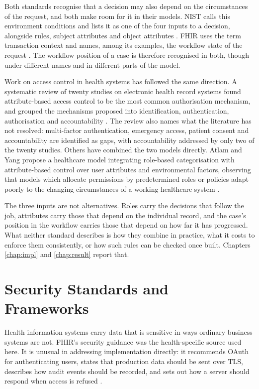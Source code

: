 Both standards recognise that a decision may also depend on the circumstances of the request, and both make room for it in their models. NIST calls this environment conditions and lists it as one of the four inputs to a decision, alongside rules, subject attributes and object attributes \cite{nist80162}. FHIR uses the term transaction context and names, among its examples, the workflow state of the request \cite{hl7fhir}. The workflow position of a case is therefore recognised in both, though under different names and in different parts of the model.

Work on access control in health systems has followed the same direction. A systematic review of twenty studies on electronic health record systems found attribute-based access control to be the most common authorisation mechanism, and grouped the mechanisms proposed into identification, authentication, authorisation and accountability \cite{cobrado2024}. The review also names what the literature has not resolved: multi-factor authentication, emergency access, patient consent and accountability are identified as gaps, with accountability addressed by only two of the twenty studies. Others have combined the two models directly. Atlam and Yang propose a healthcare model integrating role-based categorisation with attribute-based control over user attributes and environmental factors, observing that models which allocate permissions by predetermined roles or policies adapt poorly to the changing circumstances of a working healthcare system \cite{atlam2025}.

The three inputs are not alternatives. Roles carry the decisions that follow the job, attributes carry those that depend on the individual record, and the case's position in the workflow carries those that depend on how far it has progressed. What neither standard describes is how they combine in practice, what it costs to enforce them consistently, or how such rules can be checked once built. Chapters \ref{chap:impl} and \ref{chap:result} report that.

\section{Security Standards and Frameworks}
\label{sec:lr-standards}

Health information systems carry data that is sensitive in ways ordinary business systems are not. FHIR's security guidance was the health-specific source used here. It is unusual in addressing implementation directly: it recommends OAuth for authenticating users, states that production data should be sent over TLS, describes how audit events should be recorded, and sets out how a server should respond when access is refused \cite{hl7fhir}.

